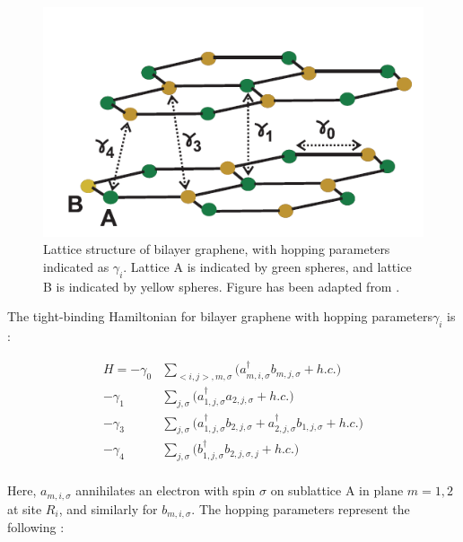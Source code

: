 \documentclass[]{article}
\begin{document}
\begin{figure}[htb]
	\centering
	\includegraphics[scale = 0.7]{bilayer_graphene.PNG}
	\caption{ Lattice structure of bilayer graphene, with hopping parameters indicated as $\gamma_i$. Lattice A is indicated by green spheres, and lattice B is indicated by yellow spheres. Figure has been adapted from \cite{The_Electronic_Properties_of_Graphene}. }
	\label{fig: Bilayer_graphene}
\end{figure}

The tight-binding Hamiltonian for bilayer graphene with hopping parameters\footnotemark $\gamma_i$ is \cite{The_Electronic_Properties_of_Graphene}:


\begin{align}
	H = -\gamma_0 &\sum_{<i,j>, m, \sigma} \bigg( a_{m, i, \sigma}^\dagger b_{m, j, \sigma} + h.c. \bigg )\\
	-\gamma_1 &\sum_{j, \sigma} \bigg( a_{1, j, \sigma}^\dagger a_{2, j, \sigma} + h.c. \bigg )\\
	-\gamma_3 &\sum_{j, \sigma} \bigg( a_{1, j, \sigma}^\dagger b_{2, j, \sigma} + a_{2, j, \sigma}^\dagger b_{1, j, \sigma} + h.c. \bigg )\\
	-\gamma_4 &\sum_{j, \sigma} \bigg( b_{1, j, \sigma}^\dagger b_{2, j, \sigma, j}  + h.c. \bigg )\\
\end{align}

Here, $a_{m, i, \sigma}$ annihilates an electron with spin $\sigma$ on sublattice A in plane $m = 1, 2$ at site $R_i$, and similarly for $b_{m, i, \sigma}$. The hopping parameters  represent the following \cite{The_Electronic_Properties_of_Graphene}:
\end{document}
